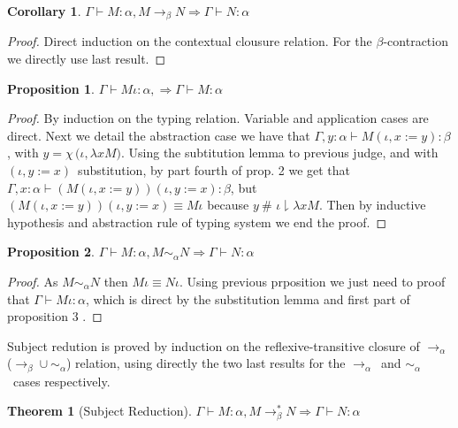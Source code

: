 \documentclass{article}
\newcommand{\res}[2]{\ensuremath{#1\downharpoonright#2}}
\newcommand{\fresh}[3]{\ensuremath{#1\ \#\,\,\res{#2}{#3}}}
\newcommand{\alpeq}{\ensuremath{\sim_{\alpha}}}
\newcommand{\upd}[3]{\ensuremath{#1, #2 {:=} #3}}
\newcommand{\choice}[1]{\ensuremath{\chi\,#1}}
\newcommand{\betaarr}{\ensuremath{\rightarrow_\beta}}
\newcommand{\betaalpha}{\ensuremath{\rightarrow_\alpha}}
\newcommand{\betaaster}{\ensuremath{\rightarrow_\beta^*}}
\newtheorem{thm}{Theorem}
\newtheorem{prop}{Proposition}
\newtheorem{coro}{Corollary}
\newcommand{\type}[3]{\ensuremath{#1 \vdash #2 : #3}}
\begin{document}
\begin{coro}
  $\type{\Gamma}{M}{\alpha}, M \betaarr N \Rightarrow \type{\Gamma}{N}{\alpha}$
\end{coro}

\begin{proof}
  Direct induction on the contextual clousure relation. For the $\beta$-contraction we directly use last result.
\end{proof}

\begin{prop}
  $\type{\Gamma}{M \iota}{\alpha}, \Rightarrow \type{\Gamma}{M}{\alpha}$
\end{prop}

\begin{proof}
  By induction on the typing relation. Variable and application cases are direct. Next we detail the abstraction case we have that $\type{\Gamma,y:\alpha}{M(\upd{\iota}{x}{y})}{\beta}$, with $y = \choice (\iota , \lambda x M)$. Using the subtitution lemma to previous judge, and with $(\upd{\iota}{y}{x})$\ substitution, by part fourth of prop. 2 we get that $\type{\Gamma,x:\alpha}{(M(\upd{\iota}{x}{y}))(\upd{\iota}{y}{x})}{\beta}$, but $(M(\upd{\iota}{x}{y}))(\upd{\iota}{y}{x}) \equiv M \iota$ because $\fresh{y}{\iota}{\lambda x M}$. Then by inductive hypothesis and abstraction rule of typing system we end the proof.
\end{proof}

\begin{prop}
  $\type{\Gamma}{M}{\alpha}, M \alpeq N \Rightarrow \type{\Gamma}{N}{\alpha}$
\end{prop}

\begin{proof}
As $M\alpeq N$ then $M\iota \equiv N\iota$. Using previous prposition we just need to proof that \type{\Gamma}{M \iota}{\alpha}, which is direct by the substitution lemma and first part of proposition 3 .
\end{proof}

Subject redution is proved by induction on the reflexive-transitive closure of \betaalpha ($\betaarr \cup \alpeq$) relation, using directly the two last results for the \betaalpha\ and \alpeq\ cases respectively.

\begin{thm}[Subject Reduction]
  $\type{\Gamma}{M}{\alpha}, M \betaaster N \Rightarrow \type{\Gamma}{N}{\alpha}$
\end{thm}
\end{document}
